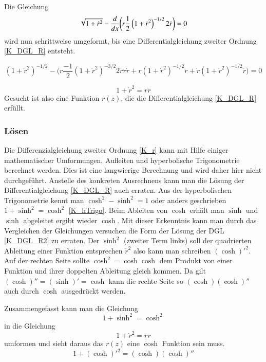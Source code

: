 \begin{refsection}
Die Gleichung 
\begin{equation} \label{K_DGL_H}
\sqrt{1+{\dot {r}}^2}-\frac{ d }{ dx } \bigg( r \frac{ 1 }{2  }\left( {1+{\dot {r}}^2}  \right)^{-1/2} 2 \dot {r}\bigg)=0
\\
\end{equation}
 wird nun schrittweise umgeformt, bis eine  Differentialgleichung zweiter Ordnung \eqref{K_DGL_R} entsteht.

\begin{equation} \label{K_DGL_H2}
\left(1+{\dot {r}}^2  \right)^{-1/2}-\bigg(r \frac{ -1 }{2  } \left({1+{\dot {r}}^2}  \right)^{-3/2} 2 \dot{r} \ddot{r}  \dot{r}+ r \left({1+{\dot {r}}^2}  \right)^{-1/2} \ddot{r} +\dot{r} \left({1+{\dot {r}}^2}  \right)^{-1/2} \dot{r}\bigg)=0
\end{equation}

\begin{equation} \label{K_DGL_R}
1+{\dot {r}}^2=r  \ddot{r}
\end{equation}
Gesucht ist also eine Funktion $r(z)$, die die Differentialgleichung \eqref{K_DGL_R} erfüllt.

\subsubsection{Lösen}
Die Differenzialgleichung zweiter Ordnung \eqref{K_r} kann mit Hilfe einiger mathematischer Umformungen, Aufleiten und hyperbolische Trigonometrie berechnet werden. 
Dies ist eine langwierige Berechnung und wird daher hier nicht durchgeführt.
Anstelle des konkreten Ausrechnens kann man die Lösung der Differentialgleichung \eqref{K_DGL_R} auch erraten. 
Aus der hyperbolischen Trigonometrie kennt man $\cosh^2-\sinh^2=1$ oder anders geschrieben $1+\sinh^2=\cosh^2$ \eqref{K_hTrigo}. 
Beim Ableiten von $\cosh$ erhält man $\sinh$ und $\sinh$ abgeleitet ergibt wieder $\cosh$. 
Mit dieser Erkenntnis kann man durch das Vergleichen der Gleichungen versuchen die Form der Lösung der DGL \eqref{K_DGL_R2} zu erraten. 
Der $\sinh^2$  (zweiter Term links) soll der quadrierten Ableitung einer Funktion entsprechen ${\dot {r}}^2$ also kann man schreiben $(\cosh)'^2$. 
Auf der rechten Seite sollte $\cosh^2=\cosh \cosh$ dem Produkt von einer Funktion und ihrer doppelten Ableitung gleich kommen. Da gilt $(\cosh)''=(\sinh)'=\cosh$ kann die rechte Seite so $(\cosh) (\cosh)''$ auch durch $\cosh$ ausgedrückt werden.


Zusammengefasst kann man die Gleichung 
\begin{equation} \label{K_hTrigo}
1+\sinh^2=\cosh^2
\end{equation}
 in die Gleichung 
 \begin{equation} \label{K_DGL_R2}
1+{\dot {r}}^2=r  \ddot{r}
\end{equation}
 umformen und sieht daraus das $r(z)$ eine $\cosh$ Funktion sein muss.
\begin{equation} \label{K_hTrigoU}
1+(\cosh)'^2=(\cosh) (\cosh)''
\end{equation}


\end{refsection}
